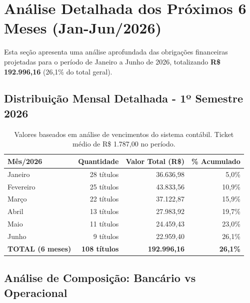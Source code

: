 \documentclass[12pt, a4paper]{article}
\begin{document}
\newpage

\section{Análise Detalhada dos Próximos 6 Meses (Jan-Jun/2026)}

Esta seção apresenta uma análise aprofundada das obrigações financeiras projetadas para o período de Janeiro a Junho de 2026, totalizando \textbf{R\$ 192.996,16} (26,1\% do total geral).

\subsection{Distribuição Mensal Detalhada - 1º Semestre 2026}

\begin{table}[H]
    \centering
    \renewcommand{\arraystretch}{1.4}
    \begin{tabularx}{\textwidth}{X r r r}
        \toprule
        \rowcolor{tableHeader} \textbf{Mês/2026} & \textbf{Quantidade} & \textbf{Valor Total (R\$)} & \textbf{\% Acumulado} \\
        \midrule
        Janeiro & 28 títulos & 36.636,98 & 5,0\% \\
        Fevereiro & 25 títulos & 43.833,56 & 10,9\% \\
        Março & 22 títulos & 37.122,87 & 15,9\% \\
        Abril & 13 títulos & 27.983,92 & 19,7\% \\
        Maio & 11 títulos & 24.459,43 & 23,0\% \\
        Junho & 9 títulos & 22.959,40 & 26,1\% \\
        \midrule
        \rowcolor{lightGray} \textbf{TOTAL (6 meses)} & \textbf{108 títulos} & \textbf{192.996,16} & \textbf{26,1\%} \\
        \bottomrule
    \end{tabularx}
    \caption*{\footnotesize Valores baseados em análise de vencimentos do sistema contábil. Ticket médio de R\$ 1.787,00 no período.}
\end{table}

\subsection{Análise de Composição: Bancário vs Operacional}
\end{document}

